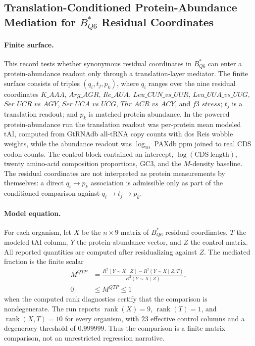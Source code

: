\subsection{Translation-Conditioned Protein-Abundance Mediation for $B^*_{Q6}$ Residual Coordinates}
\label{sec:q6-translation-mediated-protein-abundance-cross-layer}

\paragraph{Finite surface.}
This record tests whether synonymous residual coordinates in $B^*_{Q6}$ can enter a protein-abundance readout only through a translation-layer mediator.  The finite surface consists of triples $(q_i,t_j,p_k)$, where $q_i$ ranges over the nine residual coordinates
$K\_AAA$, $Arg\_AGR$, $Ile\_AUA$, $Leu\_CUN\_vs\_UUR$, $Leu\_UUA\_vs\_UUG$, $Ser\_UCR\_vs\_AGY$, $Ser\_UCA\_vs\_UCG$, $Thr\_ACR\_vs\_ACY$, and $f3\_stress$; $t_j$ is a translation readout; and $p_k$ is matched protein abundance.  In the powered protein-abundance run the translation readout was per-protein mean modeled tAI, computed from GtRNAdb all-tRNA copy counts with dos Reis wobble weights, while the abundance readout was $\log_{10}$ PAXdb ppm joined to real CDS codon counts.  The control block contained an intercept, $\log(\mathrm{CDS\ length})$, twenty amino-acid composition proportions, GC3, and the $M$-density baseline.  The residual coordinates are not interpreted as protein measurements by themselves: a direct $q_i\to p_k$ association is admissible only as part of the conditioned comparison against $q_i\to t_j\to p_k$.

\paragraph{Model equation.}
For each organism, let $X$ be the $n\times 9$ matrix of $B^*_{Q6}$ residual coordinates, $T$ the modeled tAI column, $Y$ the protein-abundance vector, and $Z$ the control matrix.  All reported quantities are computed after residualizing against $Z$.  The mediated fraction is the finite scalar
$$
\begin{aligned}
M^{QTP} &= \frac{R^2(Y\sim X\mid Z)-R^2(Y\sim X\mid Z,T)}{R^2(Y\sim X\mid Z)},\\
0 &\leq M^{QTP}\leq 1
\end{aligned}
$$
when the computed rank diagnostics certify that the comparison is nondegenerate.  The run reports $\operatorname{rank}(X)=9$, $\operatorname{rank}(T)=1$, and $\operatorname{rank}(X,T)=10$ for every organism, with $23$ effective control columns and a degeneracy threshold of $0.999999$.  Thus the comparison is a finite matrix comparison, not an unrestricted regression narrative.

